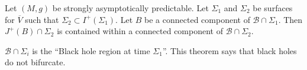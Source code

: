 \begin{theorem}[]
  Let $(M, g)$ be strongly asymptotically predictable. Let $\Sigma_1$ and $\Sigma_2$ be surfaces for $\overline{V}{}$ such that $\Sigma_2 \subset I^+(\Sigma_1)$. 
  Let $B$ be a connected component of $\mathcal{B} \cap \Sigma_1$. Then $J^+(B) \cap \Sigma_2$ is contained within a connected component of $\mathcal{B} \cap \Sigma_2$.
\end{theorem}
\begin{remark}
  $\mathcal{B} \cap \Sigma_i$ is the ``Black hole region at time $\Sigma_1$''.
  This theorem says that black holes do not bifurcate.
\end{remark}
